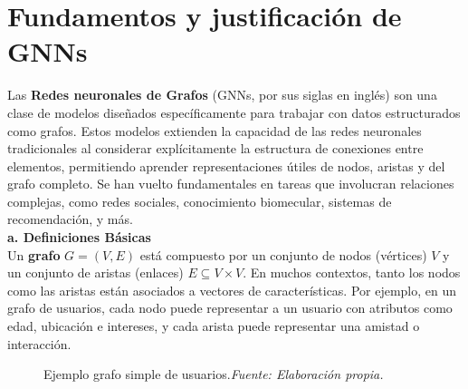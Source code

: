 \documentclass[11pt]{article} %
\begin{document}
\newpage
{\section{Fundamentos y justificación de GNNs}} 
\vspace{5pt}
Las \textbf{Redes neuronales de Grafos} (GNNs, por sus siglas en inglés) son una clase de modelos diseñados específicamente para trabajar con datos estructurados como grafos. Estos modelos extienden la capacidad de las redes neuronales tradicionales al considerar explícitamente la estructura de conexiones entre elementos, permitiendo aprender representaciones útiles de nodos, aristas y del grafo completo. Se han vuelto fundamentales en tareas que involucran relaciones complejas, como redes sociales, conocimiento biomecular, sistemas de recomendación, y más. \\[3pt]
\textbf{a. Definiciones Básicas} \\[3pt]
Un \textbf{grafo} $G = (V, E)$ está compuesto por un conjunto de nodos (vértices) $V$ y un conjunto de aristas (enlaces) $E \subseteq V \times V$. En muchos contextos, tanto los nodos como las aristas están asociados a vectores de características. Por ejemplo, en un grafo de usuarios, cada nodo puede representar a un usuario con atributos como edad, ubicación e intereses, y cada arista puede representar una amistad o interacción.
\begin{figure}[h]
\centering
{}
\caption{Ejemplo grafo simple de usuarios.\textit{Fuente: Elaboración propia.}}
\label{fig:grafo_simple}
\end{figure}
\end{document}
